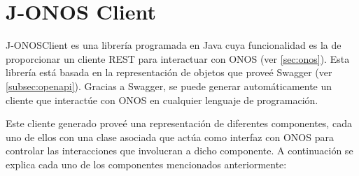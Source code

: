 \section{J-ONOS Client}
\label{sec:onosclient}

J-ONOSClient\cite{onosjavadocbib} es una librería programada en Java cuya funcionalidad es la de proporcionar un cliente \ac{REST} para interactuar con \ac{ONOS} (ver \ref{sec:onos}). Esta librería está basada en la representación de objetos que proveé Swagger (ver \ref{subsec:openapi}). Gracias a Swagger, se puede generar automáticamente un cliente que interactúe con \ac{ONOS} en cualquier lenguaje de programación.

Este cliente generado proveé una representación de diferentes componentes, cada uno de ellos con una clase asociada que actúa como interfaz con \ac{ONOS} para controlar las interacciones que involucran a dicho componente. A continuación se explica cada uno de los componentes mencionados anteriormente:

